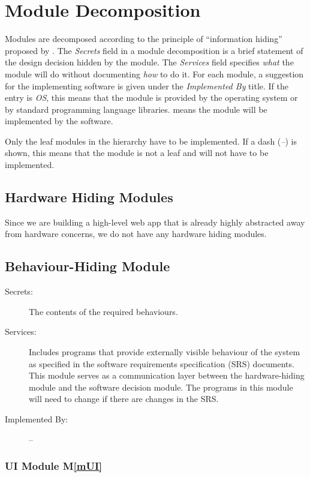 \documentclass[12pt, titlepage]{article}
\newcommand{\mref}[1]{M\ref{#1}}
\begin{document}
\section{Module Decomposition} \label{SecMD}

Modules are decomposed according to the principle of ``information hiding''
proposed by \citet{ParnasEtAl1984}. The \emph{Secrets} field in a module
decomposition is a brief statement of the design decision hidden by the
module. The \emph{Services} field specifies \emph{what} the module will do
without documenting \emph{how} to do it. For each module, a suggestion for the
implementing software is given under the \emph{Implemented By} title. If the
entry is \emph{OS}, this means that the module is provided by the operating
system or by standard programming language libraries.  \emph{\progname{}} means the
module will be implemented by the \progname{} software.

Only the leaf modules in the hierarchy have to be implemented. If a dash
(\emph{--}) is shown, this means that the module is not a leaf and will not have
to be implemented.

\subsection{Hardware Hiding Modules}

Since we are building a high-level web app that is already highly abstracted away from hardware concerns, we do not have any hardware hiding modules.

\subsection{Behaviour-Hiding Module}

\begin{description}
\item[Secrets:]The contents of the required behaviours.
\item[Services:]Includes programs that provide externally visible behaviour of
  the system as specified in the software requirements specification (SRS)
  documents. This module serves as a communication layer between the
  hardware-hiding module and the software decision module. The programs in this
  module will need to change if there are changes in the SRS.
\item[Implemented By:] --
\end{description}

\subsubsection{UI Module \mref{mUI}}
\end{document}
